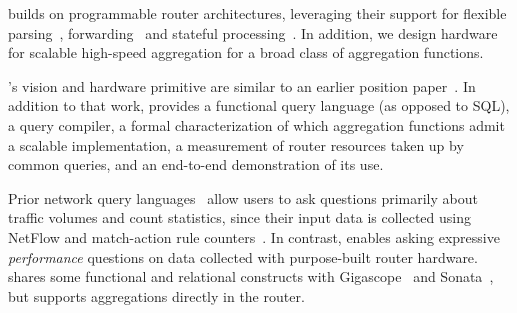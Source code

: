  \TheSystem builds on programmable router
architectures, leveraging their support for flexible
parsing~\cite{gibb_parsing}, forwarding~\cite{rmt, openflow} and stateful
processing~\cite{domino_sigcomm}. In addition, we design hardware for scalable
high-speed aggregation for a broad class of aggregation functions.

\TheSystem's vision and hardware primitive are similar to an earlier
position paper~\cite{marple-hotnets}. In addition to that work, \TheSystem
provides a functional query language (as opposed to SQL), a query compiler, a
formal characterization of which aggregation functions admit a scalable
implementation, a measurement of router resources taken up by common queries,
and an end-to-end demonstration of its use.



 Prior network query languages~\cite{gigascope,
frenetic, path_query, streaming-monitoring} allow users to ask questions
primarily about traffic volumes and count statistics, since their input data is
collected using NetFlow and match-action rule counters~\cite{openflow}. In
contrast, \TheSystem enables asking expressive {\em performance} questions on
data collected with purpose-built router hardware. \TheSystem shares some
functional and relational constructs with Gigascope~\cite{gigascope} and
Sonata~\cite{streaming-monitoring}, but supports aggregations directly in the
router.

